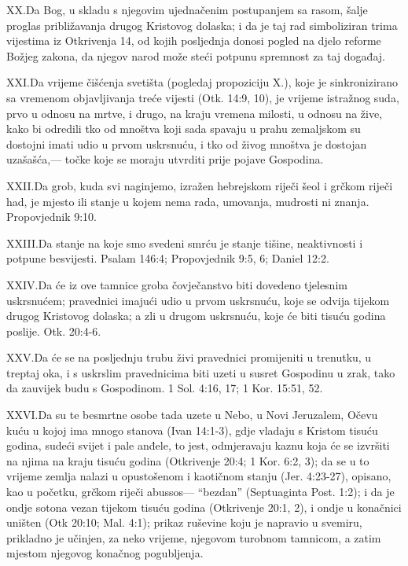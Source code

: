 \lettrine{XX.} Da Bog, u skladu s njegovim ujednačenim postupanjem sa rasom, šalje proglas približavanja drugog Kristovog dolaska; i da je taj rad simboliziran trima vijestima iz Otkrivenja 14, od kojih posljednja donosi pogled na djelo reforme Božjeg zakona, da njegov narod može steći potpunu spremnost za taj događaj.

\lettrine{XXI.} Da vrijeme čišćenja svetišta (pogledaj propoziciju X.), koje je sinkronizirano sa vremenom objavljivanja treće vijesti (Otk. 14:9, 10), je vrijeme istražnog suda, prvo u odnosu na mrtve, i drugo, na kraju vremena milosti, u odnosu na žive, kako bi odredili tko od mnoštva koji sada spavaju u prahu zemaljskom su dostojni imati udio u prvom uskrsnuću, i tko od živog mnoštva je dostojan uzašašća,— točke koje se moraju utvrditi prije pojave Gospodina.

\lettrine{XXII.} Da grob, kuda svi naginjemo, izražen hebrejskom riječi šeol i grčkom riječi had, je mjesto ili stanje u kojem nema rada, umovanja, mudrosti ni znanja. Propovjednik 9:10.

\lettrine{XXIII.} Da stanje na koje smo svedeni smrću je stanje tišine, neaktivnosti i potpune besvijesti. Psalam 146:4; Propovjednik 9:5, 6; Daniel 12:2.

\lettrine{XXIV.} Da će iz ove tamnice groba čovječanstvo biti dovedeno tjelesnim uskrsnućem; pravednici imajući udio u prvom uskrsnuću, koje se odvija tijekom drugog Kristovog dolaska; a zli u drugom uskrsnuću, koje će biti tisuću godina poslije. Otk. 20:4-6.

\lettrine{XXV.} Da će se na posljednju trubu živi pravednici promijeniti u trenutku, u treptaj oka, i s uskrslim pravednicima biti uzeti u susret Gospodinu u zrak, tako da zauvijek budu s Gospodinom. 1 Sol. 4:16, 17; 1 Kor. 15:51, 52.

\lettrine{XXVI.} Da su te besmrtne osobe tada uzete u Nebo, u Novi Jeruzalem, Očevu kuću u kojoj ima mnogo stanova (Ivan 14:1-3), gdje vladaju s Kristom tisuću godina, sudeći svijet i pale anđele, to jest, odmjeravaju kaznu koja će se izvršiti na njima na kraju tisuću godina (Otkrivenje 20:4; 1 Kor. 6:2, 3); da se u to vrijeme zemlja nalazi u opustošenom i kaotičnom stanju (Jer. 4:23-27), opisano, kao u početku, grčkom riječi abussos— “bezdan” (Septuaginta Post. 1:2); i da je ondje sotona vezan tijekom tisuću godina (Otkrivenje 20:1, 2), i ondje u konačnici uništen (Otk 20:10; Mal. 4:1); prikaz ruševine koju je napravio u svemiru, prikladno je učinjen, za neko vrijeme, njegovom turobnom tamnicom, a zatim mjestom njegovog konačnog pogubljenja.

